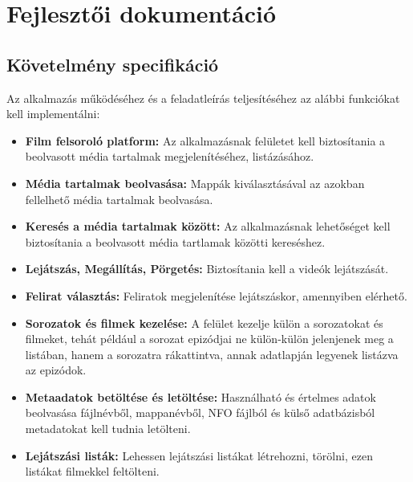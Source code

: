 \chapter{Fejlesztői dokumentáció} %
\label{ch:dev}

\section{Követelmény specifikáció}
Az alkalmazás működéséhez és a feladatleírás teljesítéséhez az alábbi funkciókat kell implementálni:
\begin{itemize}
    \item {\textbf {Film felsoroló platform: }} Az alkalmazásnak felületet kell biztosítania a beolvasott média tartalmak megjelenítéséhez, listázásához.
    \item {\textbf {Média tartalmak beolvasása: }} Mappák kiválasztásával az azokban fellelhető média tartalmak beolvasása.
	\item {\textbf {Keresés a média tartalmak között: }} Az alkalmazásnak lehetőséget kell biztosítania a beolvasott média tartlamak közötti kereséshez.
	\item {\textbf {Lejátszás, Megállítás, Pörgetés: }} Biztosítania kell a videók lejátszását.
	\item {\textbf {Felirat választás: }} Feliratok megjelenítése lejátszáskor, amennyiben elérhető.
	\item {\textbf {Sorozatok és filmek kezelése: }} A felület kezelje külön a sorozatokat és filmeket, tehát például a sorozat epizódjai ne külön-külön jelenjenek meg a listában, hanem a sorozatra rákattintva, annak adatlapján legyenek listázva az epizódok.
	\item {\textbf {Metaadatok betöltése és letöltése: }} Használható és értelmes adatok beolvasása fájlnévből, mappanévből, NFO fájlból és külső adatbázisból metadatokat kell tudnia letölteni.
    \item {\textbf {Lejátszási listák: }} Lehessen lejátszási listákat létrehozni, törölni, ezen listákat filmekkel feltölteni.
\end{itemize}

